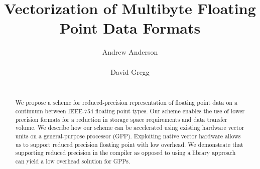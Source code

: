 \documentclass{sig-alternate-05-2015}
\begin{document}
\setlength{\parskip}{0.5em plus 0.5em minus 0.2em}



\title{Vectorization of Multibyte Floating Point Data Formats}




\author{
\alignauthor
Andrew Anderson\\
\\
\alignauthor
David Gregg\\
\\
}































\maketitle

\begin{abstract}

\noindent We propose a scheme for reduced-precision representation of floating
point data on a continuum between IEEE-754 floating point types. Our scheme
enables the use of lower precision formats for a reduction in storage space
requirements and data transfer volume. We describe how our scheme can be
accelerated using existing hardware vector units on a general-purpose
processor (GPP). Exploiting native vector hardware allows us to support reduced
precision floating point with low overhead. We demonstrate that supporting
reduced precision in the compiler as opposed to using a library approach can
yield a low overhead solution for GPPs.






\end{abstract}
\end{document}
